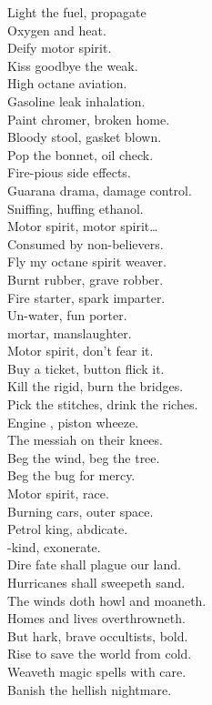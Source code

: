 Light the fuel, propagate \\
Oxygen and heat. \\
Deify motor spirit. \\
Kiss goodbye the weak. \\

High octane aviation. \\
Gasoline leak inhalation. \\
Paint chromer, broken home. \\
Bloody stool, gasket blown. \\
Pop the bonnet, oil check. \\
Fire-pious side effects. \\
Guarana drama, damage control. \\
Sniffing, huffing ethanol. \\

Motor spirit, motor spirit… \\

Consumed by non-believers. \\
Fly my octane spirit weaver. \\

Burnt rubber, grave robber. \\
Fire starter, spark imparter. \\
Un-water, fun porter. \\
 mortar, manslaughter. \\
Motor spirit, don't fear it. \\
Buy a ticket, button flick it. \\
Kill the rigid, burn the bridges. \\
Pick the stitches, drink the riches. \\

Engine , piston wheeze. \\
The messiah on their knees. \\
Beg the wind, beg the tree. \\
Beg the bug for mercy. \\
Motor spirit,  race. \\
Burning cars, outer space. \\
Petrol king, abdicate. \\
-kind, exonerate. \\

Dire fate shall plague our land. \\
Hurricanes shall sweepeth sand. \\
The winds doth howl and moaneth. \\
Homes and lives overthrowneth. \\
But hark, brave occultists, bold. \\
Rise to save the world from cold. \\
Weaveth magic spells with care. \\
Banish the hellish nightmare. \\

